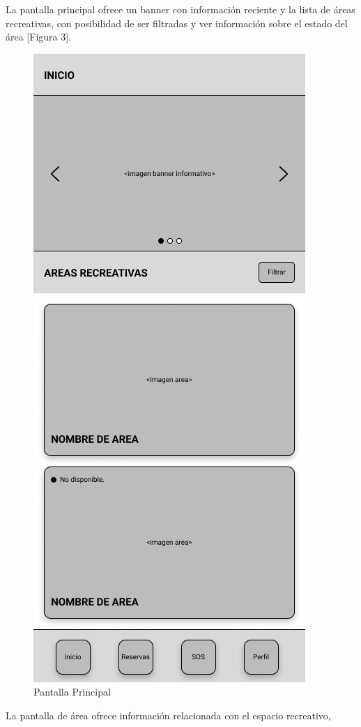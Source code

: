 \documentclass{scrartcl}
\begin{document}
        La pantalla principal ofrece un banner con información reciente y la lista
        de áreas recreativas, con posibilidad de ser filtradas y ver información
        sobre el estado del área [Figura 3].
        \begin{figure}[H]
            \centerline{\includegraphics[scale=0.20]{wirehome}}
            \caption{Pantalla Principal}
            \label{fig:wirehome}
        \end{figure}
        La pantalla de área ofrece información relacionada con el espacio recreativo,
\end{document}
